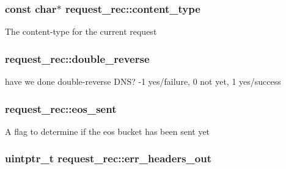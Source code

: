 \subsubsection[{\texorpdfstring{content\+\_\+type}{content_type}}]{\setlength{\rightskip}{0pt plus 5cm}const char$\ast$ request\+\_\+rec\+::content\+\_\+type}\hypertarget{structrequest__rec_a20f5c95ec98dd85531697aae3acbb26b}{}\label{structrequest__rec_a20f5c95ec98dd85531697aae3acbb26b}
The content-\/type for the current request 
\subsubsection[{\texorpdfstring{double\+\_\+reverse}{double_reverse}}]{ request\+\_\+rec\+::double\+\_\+reverse}\hypertarget{structrequest__rec_a3276688038f0dd0f211eb82a28fed8dd}{}\label{structrequest__rec_a3276688038f0dd0f211eb82a28fed8dd}
have we done double-\/reverse D\+NS? -\/1 yes/failure, 0 not yet, 1 yes/success 
\subsubsection[{\texorpdfstring{eos\+\_\+sent}{eos_sent}}]{ request\+\_\+rec\+::eos\+\_\+sent}\hypertarget{structrequest__rec_a0b4d967e1511b2ab93cd44987d658d43}{}\label{structrequest__rec_a0b4d967e1511b2ab93cd44987d658d43}
A flag to determine if the eos bucket has been sent yet 
\subsubsection[{\texorpdfstring{err\+\_\+headers\+\_\+out}{err_headers_out}}]{\setlength{\rightskip}{0pt plus 5cm}uintptr\+\_\+t request\+\_\+rec\+::err\+\_\+headers\+\_\+out}\hypertarget{structrequest__rec_a691d46e2e4fcf604394aeda5cc6e21e2}{}\label{structrequest__rec_a691d46e2e4fcf604394aeda5cc6e21e2}
